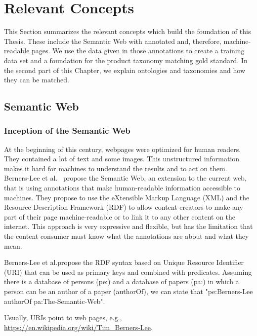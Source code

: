 \chapter{Relevant Concepts}
\label{ch:relevant-concepts}

This Section summarizes the relevant concepts which build the foundation of this Thesis.
These include the Semantic Web with annotated and, therefore, machine-readable pages.
We use the data given in those annotations to create a training data set and a foundation for
the product taxonomy matching gold standard.
In the second part of this Chapter, we explain ontologies and taxonomies and how they can be matched.

\section{Semantic Web}
\label{sec:semantic-web}

\subsection{Inception of the Semantic Web}
\label{subsec:semantic-web-concepts}

At the beginning of this century, webpages were optimized for human readers.
They contained a lot of text and some images.
This unstructured information makes it hard for machines to understand the results and to act on them.
Berners-Lee et al.\@~\cite{berners2001semantic} propose the Semantic Web, an extension to the current web,
that is using annotations that make human-readable information accessible to machines.
They propose to use the eXtensible Markup Language (XML) and the Resource Description Framework (RDF) to allow
content-creators to make any part of their page machine-readable or to link it to any other content on the internet.
This approach is very expressive and flexible, but has the limitation that the content consumer must know
what the annotations are about and what they mean.

Berners-Lee et al.\@ propose the RDF syntax based on Unique Resource Identifier (URI) that can be used as primary
keys and combined with predicates.
Assuming there is a database of persons (pe:) and a database of papers (pa:) in which a person can be an author of a paper (authorOf),
we can state that "pe:Berners-Lee authorOf pa:The-Semantic-Web".

Usually, URIs point to web pages, e.g., \url{https://en.wikipedia.org/wiki/Tim\_Berners-Lee}.


